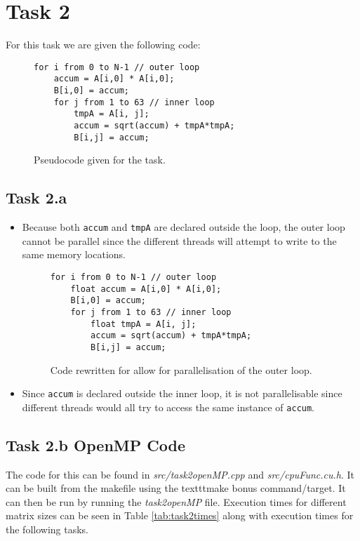 \section{Task 2}

For this task we are given the following code:
\begin{figure}
    \begin{lstlisting}
for i from 0 to N-1 // outer loop
    accum = A[i,0] * A[i,0];
    B[i,0] = accum;
    for j from 1 to 63 // inner loop
        tmpA = A[i, j];
        accum = sqrt(accum) + tmpA*tmpA;
        B[i,j] = accum;
    \end{lstlisting}
    \caption{Pseudocode given for the task.}
    \label{fig:t2code1}
\end{figure}

\subsection{Task 2.a}

\begin{itemize}
    \item Because both \texttt{accum} and \texttt{tmpA} are declared outside the
    loop, the outer loop cannot be parallel since the different threads will
    attempt to write to the same memory locations.

    \begin{figure}
        \begin{lstlisting}
for i from 0 to N-1 // outer loop
    float accum = A[i,0] * A[i,0];
    B[i,0] = accum;
    for j from 1 to 63 // inner loop
        float tmpA = A[i, j];
        accum = sqrt(accum) + tmpA*tmpA;
        B[i,j] = accum;
        \end{lstlisting}
        \caption{Code rewritten for allow for parallelisation of the outer
            loop.}
        \label{fig:t2code2}
    \end{figure}

    \item Since \texttt{accum} is declared outside the inner loop, it is not
    parallelisable since different threads would all try to access the same
    instance of \texttt{accum}.


\end{itemize}

\subsection{Task 2.b OpenMP Code}
The code for this can be found in \textit{src/task2openMP.cpp} and
\textit{src/cpuFunc.cu.h}. It can be built from the makefile using the
texttt{make bonus} command/target. It can then be run by running the
\textit{task2openMP} file. Execution times for different matrix sizes can be
seen in Table \ref{tab:task2times} along with execution times for the following
tasks.

